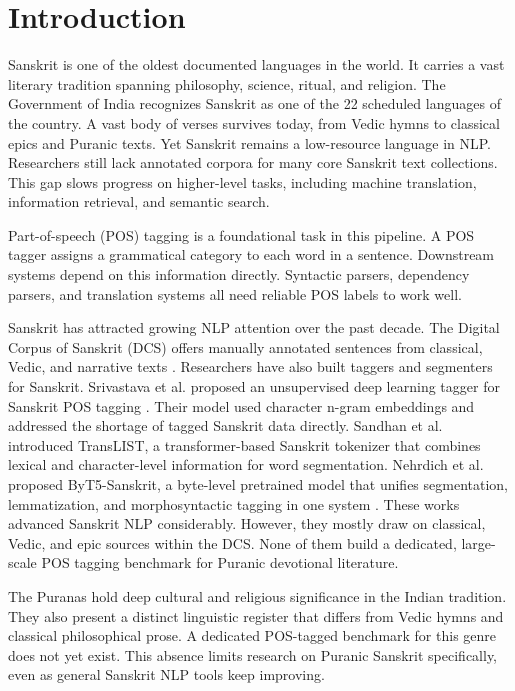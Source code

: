 \documentclass[conference]{IEEEtran}
\begin{document}
\section{Introduction}
Sanskrit is one of the oldest documented languages in the world. It carries a vast literary tradition spanning philosophy, science, ritual, and religion. The Government of India recognizes Sanskrit as one of the 22 scheduled languages of the country. A vast body of verses survives today, from Vedic hymns to classical epics and Puranic texts. Yet Sanskrit remains a low-resource language in NLP. Researchers still lack annotated corpora for many core Sanskrit text collections. This gap slows progress on higher-level tasks, including machine translation, information retrieval, and semantic search.

Part-of-speech (POS) tagging is a foundational task in this pipeline. A POS tagger assigns a grammatical category to each word in a sentence. Downstream systems depend on this information directly. Syntactic parsers, dependency parsers, and translation systems all need reliable POS labels to work well.

Sanskrit has attracted growing NLP attention over the past decade. The Digital Corpus of Sanskrit (DCS) offers manually annotated sentences from classical, Vedic, and narrative texts \cite{hellwig_dcs}. Researchers have also built taggers and segmenters for Sanskrit. Srivastava et al. proposed an unsupervised deep learning tagger for Sanskrit POS tagging \cite{srivastava2018}. Their model used character n-gram embeddings and addressed the shortage of tagged Sanskrit data directly. Sandhan et al. introduced TransLIST, a transformer-based Sanskrit tokenizer \cite{sandhan2022} that combines lexical and character-level information for word segmentation. Nehrdich et al. proposed ByT5-Sanskrit, a byte-level pretrained model that unifies segmentation, lemmatization, and morphosyntactic tagging in one system \cite{nehrdich2024}. These works advanced Sanskrit NLP considerably. However, they mostly draw on classical, Vedic, and epic sources within the DCS. None of them build a dedicated, large-scale POS tagging benchmark for Puranic devotional literature.

The Puranas hold deep cultural and religious significance in the Indian tradition. They also present a distinct linguistic register that differs from Vedic hymns and classical philosophical prose. A dedicated POS-tagged benchmark for this genre does not yet exist. This absence limits research on Puranic Sanskrit specifically, even as general Sanskrit NLP tools keep improving.
\end{document}
